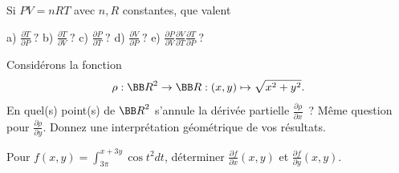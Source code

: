 \documentclass[12pt,french,oneside,a4paper]{memoir} %
\begin{document}
\begin{exo}
Si $PV=nRT$ avec $n, R$ constantes, que valent

\hspace*{5mm}a) $\displaystyle{\frac{\partial T}{\partial P}}~?$\qquad
b) $\displaystyle{\frac{\partial T}{\partial V}}~?$\qquad
c) $\displaystyle{\frac{\partial P}{\partial T}}~?$\qquad
d) $\displaystyle{\frac{\partial V}{\partial P}}~?$\qquad
e) $\displaystyle{\frac{\partial P}{\partial V}\frac{\partial V}
{\partial T}
\frac{\partial T}{\partial P}}~?$
\end{exo}
\begin{exo}
Considérons la fonction
\begin{equation*}
\rho:{\BB R}^2\rightarrow\BB R : (x,y)\mapsto\sqrt{x^2+y^2}.
\end{equation*}
En quel(s) point(s) de ${\BB R}^2$ s'annule la dérivée
partielle $\displaystyle{\frac{\partial \rho}{\partial x}}$~? Même
question pour $\displaystyle{\frac{\partial \rho}{\partial y}}$.
Donnez une interprétation géométrique de vos résultats.
\end{exo}
\begin{exo}
Pour $f(x,y)=\displaystyle{\int^{x+3y}_{3\pi}\cos t^2dt}$,
déterminer $\displaystyle{\frac{\partial f}{\partial x}(x,y)}$ et 
$\displaystyle{\frac{\partial f}{\partial y}(x,y)}$.
\end{exo}
\end{document}
